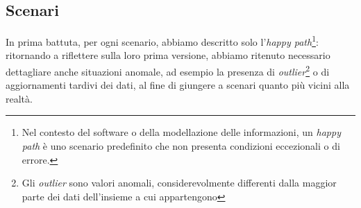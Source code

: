 \subsection{Scenari}
In prima battuta, per ogni scenario, abbiamo descritto solo l'\textit{happy path}\footnote{Nel contesto del software o della modellazione delle informazioni, un \textit{happy path} è uno scenario predefinito che non presenta condizioni eccezionali o di errore.}: ritornando a riflettere sulla loro prima versione, abbiamo ritenuto necessario dettagliare anche situazioni anomale, ad esempio la presenza di \textit{outlier}\footnote{Gli \textit{outlier} sono valori anomali, considerevolmente differenti dalla maggior parte dei dati dell'insieme a cui appartengono} o di aggiornamenti tardivi dei dati, al fine di giungere a scenari quanto più vicini alla realtà.











